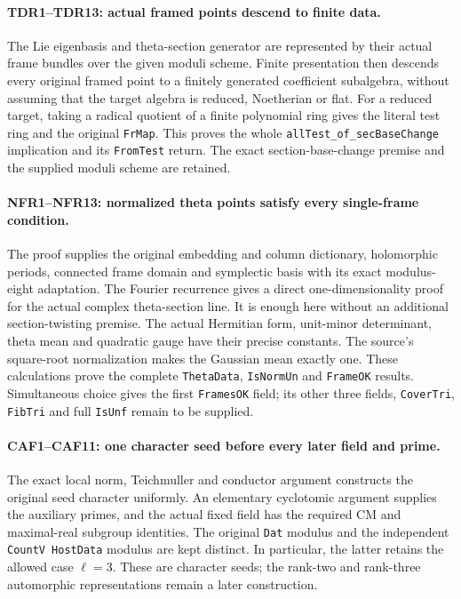 \documentclass[11pt,a4paper]{article}
\numberwithin{equation}{section}
\theoremstyle{remark}\newtheorem{remark}[theorem]{Remark}
\begin{document}
\paragraph{TDR1--TDR13: actual framed points descend to finite data.}
The Lie eigenbasis and theta-section generator are represented by their
actual frame bundles over the given moduli scheme. Finite presentation
then descends every original framed point to a finitely generated
coefficient subalgebra, without assuming that the target algebra is
reduced, Noetherian or flat. For a reduced target, taking a radical
quotient of a finite polynomial ring gives the literal test ring and
the original \texttt{Fr\allowbreak Map}. This proves the whole
\texttt{all\allowbreak Test\_\allowbreak of\_\allowbreak sec\allowbreak Base\allowbreak Change} implication and its
\texttt{From\allowbreak Test} return. The exact section-base-change premise and
the supplied moduli scheme are retained.

\paragraph{NFR1--NFR13: normalized theta points satisfy every single-frame condition.}
The proof supplies the original embedding and column dictionary,
holomorphic periods, connected frame domain and symplectic basis with
its exact modulus-eight adaptation. The Fourier recurrence gives a
direct one-dimensionality proof for the actual complex theta-section
line. It is enough here without an additional section-twisting premise.
The actual Hermitian form, unit-minor determinant, theta mean and
quadratic gauge have their precise constants. The source's square-root
normalization makes the Gaussian mean exactly one. These calculations
prove the complete \texttt{Theta\allowbreak Data}, \texttt{Is\allowbreak Norm\allowbreak Un} and
\texttt{Frame\allowbreak OK} results. Simultaneous choice gives the first
\texttt{Frames\allowbreak OK} field; its other three fields, \texttt{Cover\allowbreak Tri},
\texttt{Fib\allowbreak Tri} and full \texttt{Is\allowbreak Unf} remain to be supplied.

\paragraph{CAF1--CAF11: one character seed before every later field and prime.}
The exact local norm, Teichmuller and conductor argument constructs the
original seed character uniformly. An elementary cyclotomic argument
supplies the auxiliary primes, and the actual fixed field has the
required CM and maximal-real subgroup identities. The original
\texttt{Dat} modulus and the independent \texttt{Count\allowbreak V Host\allowbreak Data}
modulus are kept distinct. In particular, the latter retains the
allowed case $\ell=3$. These are character seeds; the rank-two and
rank-three automorphic representations remain a later construction.
\end{document}
